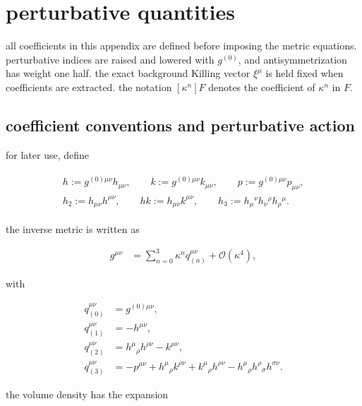 \section{perturbative quantities}\label{app:perturbative-quantities}

all coefficients in this appendix are defined before imposing the metric equations. perturbative indices are raised and lowered with $\displaystyle{g^{(0)}}$, and antisymmetrization has weight one half. the exact background Killing vector $\displaystyle{\xi ^\mu}$ is held fixed when coefficients are extracted. the notation $\displaystyle{[\kappa ^n]F}$ denotes the coefficient of $\displaystyle{\kappa ^n}$ in $\displaystyle{F}$.

\subsection{coefficient conventions and perturbative action}\label{subsec:coefficient-conventions}

for later use, define

\begin{align}
\begin{gathered}
h:=g^{(0)\mu \nu}h_{\mu \nu},\qquad k:=g^{(0)\mu \nu}k_{\mu \nu},\qquad p:=g^{(0)\mu \nu}p_{\mu \nu}, \\
h_{2}:=h_{\mu \nu}h^{\mu \nu},\qquad hk:=h_{\mu \nu}k^{\mu \nu},\qquad h_{3}:=h_{\mu}{}^{\nu}h_{\nu}{}^{\rho}h_{\rho}{}^{\mu}.
\end{gathered}
\end{align}

the inverse metric is written as

\begin{align}
g^{\mu \nu} & =\sum _{n=0}^{3}\kappa ^n q_{(n)}^{\mu \nu}+\mathcal{O}(\kappa ^4),
\end{align}

with

\[\begin{aligned}
q_{(0)}^{\mu \nu} & =g^{(0)\mu \nu}, \\
q_{(1)}^{\mu \nu} & =-h^{\mu \nu}, \\
q_{(2)}^{\mu \nu} & =h^{\mu}{}_{\rho}h^{\rho \nu}-k^{\mu \nu}, \\
q_{(3)}^{\mu \nu} & =-p^{\mu \nu}+h^{\mu}{}_{\rho}k^{\rho \nu}+k^{\mu}{}_{\rho}h^{\rho \nu}-h^{\mu}{}_{\rho}h^{\rho}{}_{\sigma}h^{\sigma \nu}.
\end{aligned}\]

the volume density has the expansion

